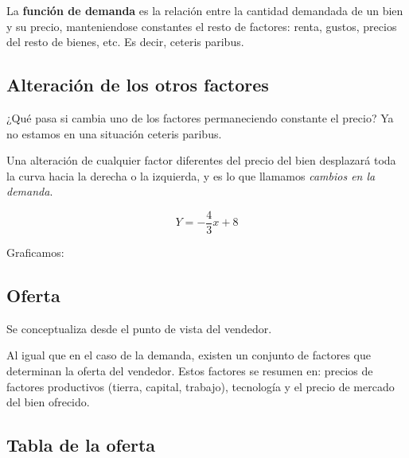 La \textbf{función de demanda} es la relación entre la cantidad demandada de un bien y su precio,
manteniendose constantes el resto de factores: renta, gustos, precios del resto de bienes, etc.
Es decir,
ceteris paribus.

\subsection{Alteración de los otros factores}

¿Qué pasa si cambia uno de los factores permaneciendo constante el precio?
Ya no estamos en una situación ceteris paribus.

Una alteración de cualquier factor diferentes del precio del bien
desplazará toda la curva hacia la derecha o la izquierda,
y es lo que llamamos \textit{cambios en la demanda}.

\begin{equation*}
    Y = -\frac{4}{3}x + 8
\end{equation*}

Graficamos:

\begin{center}
\end{center}

\subsection{Oferta}

Se conceptualiza desde el punto de vista del vendedor.

Al igual que en el caso de la demanda,
existen un conjunto de factores que determinan la oferta del vendedor.
Estos factores se resumen en:
precios de factores productivos
(tierra, capital, trabajo),
tecnología
y el precio de mercado del bien ofrecido.

\subsection{Tabla de la oferta}

